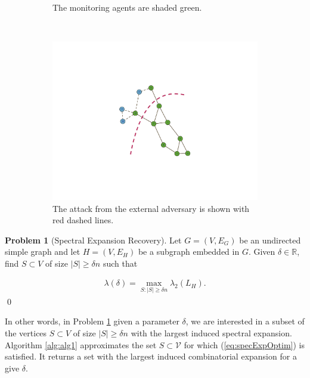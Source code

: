 \documentclass{amsart}
\theoremstyle{definition}
\newtheorem{problem}{Problem}
\theoremstyle{remark}
\numberwithin{equation}{section}
\def\cV{\mathcal{V}}
\begin{document}
\begin{center}
\begin{figure}
\begin{subfigure}[b]{0.25\textwidth}
                \caption{The monitoring agents are shaded green.}
                \label{fig:monitoringagents}
        \end{subfigure}
        ~ %
        \begin{subfigure}[b]{0.25\textwidth}
                \includegraphics[scale=0.25]{PmonCut.pdf}
                \caption{The attack from the external adversary is shown with red dashed lines.}
                \label{fig:adversaryCut}
        \end{subfigure}
        \caption{}\label{fig:TeixierasNetworkCut}
\end{figure}
\end{center}
\begin{problem}[Spectral Expansion Recovery] \label{pr:p1}
Let $G=(V,E_G)$ be an undirected simple graph and let $H=(V,E_H)$ be a subgraph embedded in $G$. Given $\delta \in \mathbb{R}$, find $S \subset V$ of size $|S| \geq \delta n$ such that

\begin{align} \label{eq:specExpOptim}
\lambda(\delta) = \max_{S:|S|\geq \delta n} \lambda_2(L_H).
\end{align} \qed
\end{problem}
In other words, in Problem \ref{pr:p1} given a parameter $\delta$, we are interested in a subset of the vertices $S\subset V$ of size $|S|\geq \delta n$ with the largest induced spectral expansion.
Algorithm \ref{alg:alg1} approximates the set $S \subset \cV$ for which (\ref{eq:specExpOptim}) is satisfied. It returns a set with the largest induced combinatorial expansion for a give $\delta$. 
\end{document}
